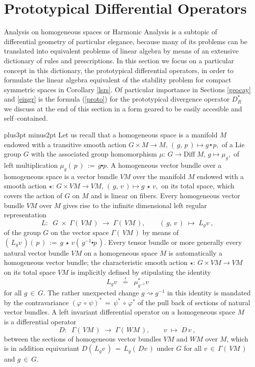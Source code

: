 \documentclass[12pt]{article}
\def\pfill{\vskip6pt plus3pt minus2pt\noindent}
\begin{document}
\section{Prototypical Differential Operators}
\label{prodiff}
%
 Analysis on homogeneous spaces or Harmonic Analysis is a subtopic of
 differential geometry of particular elegance, because many of its problems
 can be translated into equivalent problems of linear algebra by means of an
 extensive dictionary of rules and prescriptions. In this section we focus
 on a particular concept in this dictionary, the prototypical differential
 operators, in order to formulate the linear algebra equivalent of the
 stability problem for compact symmetric spaces in Corollary \ref{lsrs}.
 Of particular importance in Sections \ref{geocay} and \ref{eingr} is the
 formula (\ref{proto}) for the prototypical divergence operator $D^*_R$ we
 discuss at the end of this section in a form geared to be easily accesible
 and self--contained.

 \pfill
 Let us recall that a homogeneous space is a manifold $M$ endowed with a
 transitive smooth action $G\times M\longrightarrow M,\,(\,g,\,p\,)
 \longmapsto g\,\centerdot\,p,$ of a Lie group $G$ with the associated group
 homomorphism $\mu:\,G\longrightarrow\mathrm{Diff}\;M,\,g\longmapsto\mu_g,$
 of left multiplication $\mu_g(\,p\,)\,:=\,g\centerdot p$. A homogeneous
 vector bundle over a homogeneous space is a vector bundle $VM$ over the
 manifold $M$ endowed with a smooth action $\star:\,G\times VM\longrightarrow
 VM,\,(\,g,\,v\,)\longmapsto g\,\star\,v,$ on its total space, which covers
 the action of $G$ on $M$ and is linear on fibers. Every homogeneous vector
 bundle $VM$ over $M$ gives rise to the infinite dimensional left regular
 representation
 $$
  L:\;\;G\;\times\;\Gamma(\,VM\,)\;\longrightarrow\;\Gamma(\,VM\,),
  \qquad(\,g,\,v\,)\;\longmapsto\;L_gv\ ,
 $$
 of the group $G$ on the vector space $\Gamma(\,VM\,)$ by means of
 $(\,L_gv\,)(\,p\,)\,:=\,g\,\star\,v(\,g^{-1}\centerdot p\,)$. Every tensor
 bundle or more generally every natural vector bundle $VM$ on a homogeneous
 space $M$ is automatically a homogeneous vector bundle; the characteristic
 smooth action $\star:\,G\times VM\longrightarrow VM$ on its total space $VM$
 is implicitly defined by stipulating the identity
 \begin{equation}\label{req}
  L_gv
  \;\;\stackrel!=\;\;
  \mu_{g^{-1}}^*v
 \end{equation}
 for all $g\,\in\,G$. The rather unexpected change $g\rightsquigarrow g^{-1}$
 in this identity is mandated by the contravariance $(\varphi\,\circ\,\psi)^*
 \,=\,\psi^*\,\circ\,\varphi^*$ of the pull back of sections of natural vector
 bundles. A left invariant differential operator on a homogeneous space $M$
 is a differential operator
 \begin{equation}\label{ldo}
  D:\;\;\Gamma(\,VM\,)\;\longrightarrow\;\Gamma(\,WM\,),\qquad
  v\;\longmapsto\;D\,v\ ,
 \end{equation}
 between the sections of homogeneous vector bundles $VM$ and $WM$ over $M$,
 which is in addition equivariant $D(\,L_gv\,)\,=\,L_g(\,Dv\,)$ under $G$ for
 all $v\,\in\,\Gamma(\,VM\,)$ and $g\,\in\,G$. 
\end{document}
